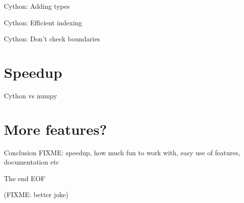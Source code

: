\documentclass[dvipsnames]{beamer}
\begin{document}
\begin{frame}{Cython: Adding types}

\end{frame}

\begin{frame}{Cython: Efficient indexing}

\end{frame}

\begin{frame}{Cython: Don't check boundaries}

\end{frame}

\section{Speedup}

\begin{frame}{Cython vs numpy}

\end{frame}

\section{More features?}

\begin{frame}{Conclusion}
FIXME: speedup, how much fun to work with, easy use of features, documentation etc
\end{frame}

\begin{frame}{The end}
EOF

(FIXME: better joke)
\end{frame}
\end{document}
